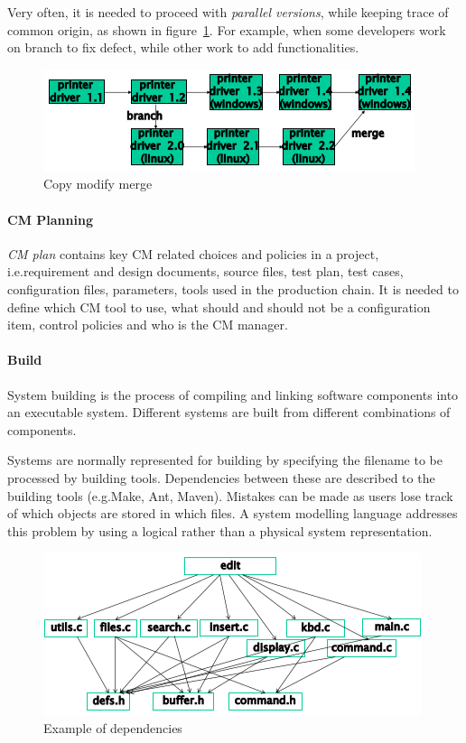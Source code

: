Very often, it is needed to proceed with \emph{parallel versions}, while keeping trace of common origin, as shown in figure~\ref{img:branches_merges}. For example, when some developers work on branch to fix defect, while other work to add functionalities.

\begin{figure}[hbtp]
\centering
\includegraphics[scale=0.5]{images/branches_merges.png}
\caption{Copy modify merge}
\label{img:branches_merges}
\end{figure}

\paragraph{CM Planning}
\emph{CM plan} contains key CM related choices and policies in a project, i.e.\@ requirement and design documents, source files, test plan, test cases, configuration files, parameters, tools used in the production chain. It is needed to define which CM tool to use, what should and should not be a configuration item, control policies and who is the CM manager.

\paragraph{Build}
System building is the process of compiling and linking software components into an executable system. Different systems are built from different combinations of components.

Systems are normally represented for building by specifying the filename to be processed by building tools. Dependencies between these are described to the building tools (e.g.\@ Make, Ant, Maven). Mistakes can be made as users lose track of which objects are stored in which files. A system modelling language addresses this problem by using a logical rather than a physical system representation.

\begin{figure}[hbtp]
\centering
\includegraphics[scale=0.5]{images/dependencies.png}
\caption{Example of dependencies}
\end{figure}